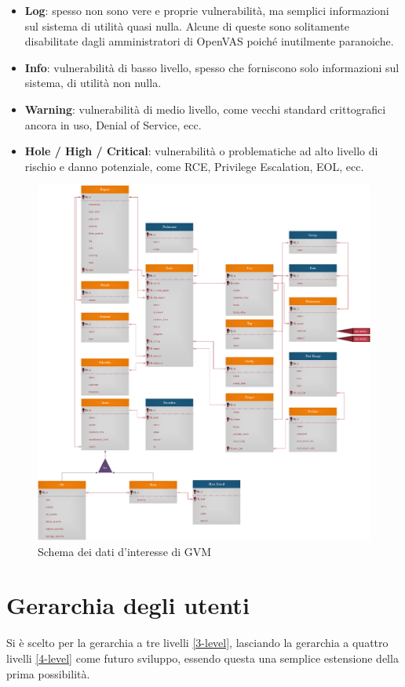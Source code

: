 \begin{itemize}
\begin{itemize}
        \item \textbf{Log}: spesso non sono vere e proprie vulnerabilità, ma semplici informazioni sul sistema di utilità quasi nulla. Alcune di queste sono solitamente disabilitate dagli amministratori di OpenVAS poiché inutilmente paranoiche.
        \item \textbf{Info}: vulnerabilità di basso livello, spesso che forniscono solo informazioni sul sistema, di utilità non nulla.
        \item \textbf{Warning}: vulnerabilità di medio livello, come vecchi standard crittografici ancora in uso, Denial of Service, ecc.
        \item \textbf{Hole / High / Critical}: vulnerabilità o problematiche ad alto livello di rischio e danno potenziale, come RCE, Privilege Escalation, EOL, ecc.
    \end{itemize}
\end{itemize}

\begin{figure}
    \includegraphics[width=\textwidth]{img/er_crow.png}
    \caption{Schema dei dati d'interesse di GVM}
    \label{er-crow}
\end{figure}

\section{Gerarchia degli utenti}
Si è scelto per la gerarchia a tre livelli \ref{3-level}, lasciando la gerarchia a quattro livelli \ref{4-level} come futuro sviluppo, essendo questa una semplice estensione della prima possibilità.